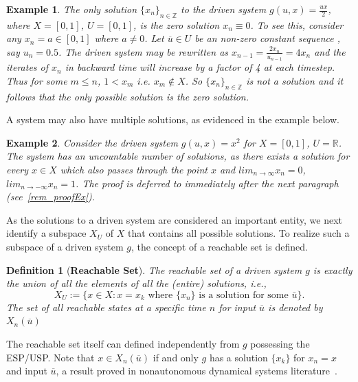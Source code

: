 \documentclass[a4paper,12pt,twoside]{report}
\newtheorem{Definition}{Definition}[]
\newtheorem{Example}{Example}[]
\begin{document}
\begin{Example} \rm \label{ex_halfux}
  The only solution  $\{x_n\}_{n\in\mathbb{Z}}$ to the driven system  $g(u,x)=\frac{ux}{2}$, where $X=[0,1]$, $U=[0,1]$,  is the zero solution $x_n\equiv0$.
  To see this, consider any $x_n=a\in[0,1]$ where $a\neq{0}$.  Let $\overline{u}\in{U}$ be an non-zero constant sequence , say $u_n=0.5$. 
  The driven system may be rewritten as $x_{n-1}=\frac{2x_n}{u_{n-1}}=4x_n$ and the  iterates of $x_n$ in backward time will increase by a factor of 4 at each timestep. 
  Thus for some $m\leq{n}$,  $1<x_m$ i.e. $x_m\notin{X}$. So ${\{x_n\}}_{n\in\mathbb{Z}}$ is not a solution and it follows that the only possible solution is the zero solution.
\end{Example}


A system may also have multiple solutions, as evidenced in the example below.

\begin{Example}\label{Ex_exp} \rm 
  Consider the driven system $g(u,x)=x^2$ for $X=[0,1]$, $U=\mathbb{R}$. The system has an uncountable number of solutions, as there exists a solution for every $x\in{X}$ which also passes through the point $x$ and $lim_{n\to\infty}x_n=0$, $lim_{n\to{-}\infty}x_n=1$.  
 The proof is deferred to immediately after the next paragraph (see~\ref{rem_proofEx}).
\end{Example}

As the solutions to a driven system are considered an important entity, we next identify a subspace $X_U$ of $X$ that contains all possible solutions. To realize such a subspace of a driven system $g$, the concept of a reachable set is defined.

\begin{Definition}
  [\bf Reachable Set]\label{Dfn_ReachableSet}\rm
The reachable set of a driven system $g$ is exactly the union of all the elements of all the (entire) solutions, i.e., 
\[X_U :=\Big \{x \in X:  x = x_k \mbox{ where  $\{x_n\}$  is a solution for some  $\bar{u}$} \Big \}.\]
The set of all reachable states at a specific time $n$ for input $\overline{u}$ is denoted by $X_n(\overline{u})$
\end{Definition}

The reachable set itself can defined independently from $g$ possessing the ESP/USP. Note that $x\in{X_n(\overline{u})}$ if and only $g$ has a solution $\{x_k\}$ for $x_n=x$ and input $\overline{u}$, a result proved in nonautonomous dynamical systems literature~\cite{manjunath2014dynamics, manjunath2013echo}. 
\end{document}
